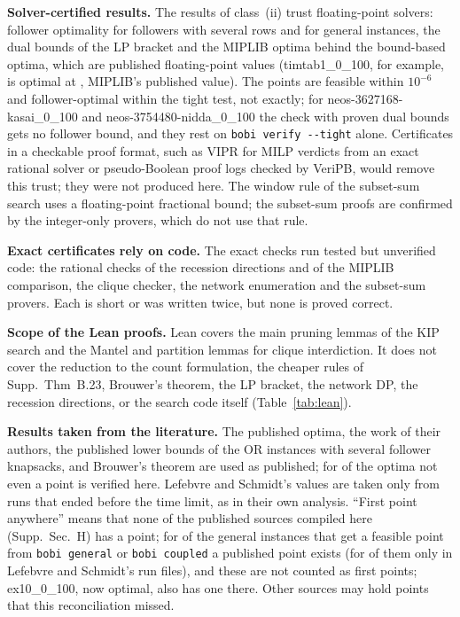 \documentclass[]{spie}  %
\theoremstyle{plain}
\newcommand{\code}[1]{\texttt{#1}}
\newcommand{\inst}[1]{\mbox{#1}}             %
\newcommand{\cls}[1]{class~(#1)}             %
\begin{document}
\textbf{Solver-certified results.} The results of \cls{ii} trust floating-point solvers: follower
optimality for followers with several rows and for general instances, the dual bounds of the LP
bracket and the MIPLIB optima behind the \NumHprOptimal{} bound-based optima, which are published
floating-point values (\inst{timtab1\_0\_100}, for example, is optimal at \TimtabOptimum{}, MIPLIB's
published value). The points are feasible within $10^{-6}$ and follower-optimal within the tight
test, not exactly; for \inst{neos-3627168-kasai\_0\_100} and \inst{neos-3754480-nidda\_0\_100} the
check with proven dual bounds gets no follower bound, and they rest on \code{bobi verify -{}-tight}
alone. Certificates in a checkable proof format,
such as VIPR for MILP verdicts\cite{cheung2017verifying} from an exact rational
solver\cite{eifler2023computational} or pseudo-Boolean proof logs checked by
VeriPB,\cite{bogaerts2023certified} would remove this trust; they were not produced here. The
window rule of the subset-sum search uses a floating-point fractional bound; the \NumNewKip{}
subset-sum proofs are confirmed by the integer-only provers, which do not use that rule.

\textbf{Exact certificates rely on code.} The exact checks run tested but unverified code: the
rational checks of the recession directions and of the MIPLIB comparison, the clique checker, the
network enumeration and the subset-sum provers. Each is short or was written twice, but none is
proved correct.

\textbf{Scope of the Lean proofs.} Lean covers the main pruning lemmas of the KIP search and the
Mantel and partition lemmas for clique interdiction. It does not cover the reduction to the count
formulation, the cheaper rules of Supp.\ Thm~B.23, Brouwer's theorem, the LP bracket, the network
DP, the recession directions, or the search code itself (Table~\ref{tab:lean}).

\textbf{Results taken from the literature.} The \NumLitOptimal{} published optima, the work of
their authors, the published lower bounds of the OR instances with several follower knapsacks,
and Brouwer's theorem are used as published; for \NumLitNoFile{} of the optima not even a point is
verified here. Lefebvre and Schmidt's values are taken only from runs that ended before the time
limit, as in their own analysis. ``First point anywhere'' means that none of the published sources
compiled here (Supp.\ Sec.~H) has a point; for \NumGeneralPublishedPoint{} of the general instances
that get a feasible point from \code{bobi general} or \code{bobi coupled} a published point exists
(for \NumGeneralPublishedLS{} of them only in Lefebvre and Schmidt's run files), and these are not
counted as first points; \inst{ex10\_0\_100}, now optimal, also has one there. Other sources may
hold points that this reconciliation missed.
\end{document}
